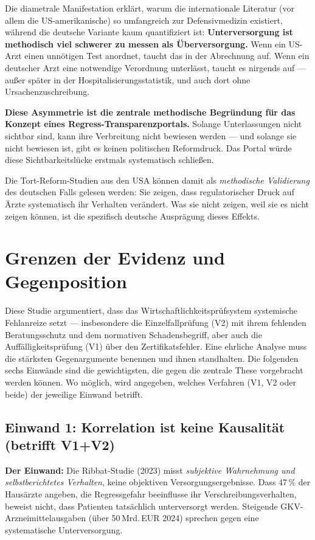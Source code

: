 \documentclass{umbruch-position}
\begin{document}
Die diametrale Manifestation erklärt, warum die internationale Literatur (vor allem die US-amerikanische) so umfangreich zur Defensivmedizin existiert, während die deutsche Variante kaum quantifiziert ist: \textbf{Unterversorgung ist methodisch viel schwerer zu messen als Überversorgung.} Wenn ein US-Arzt einen unnötigen Test anordnet, taucht das in der Abrechnung auf. Wenn ein deutscher Arzt eine notwendige Verordnung unterlässt, taucht es nirgends auf --- außer später in der Hospitalisierungsstatistik, und auch dort ohne Ursachenzuschreibung.

\textbf{Diese Asymmetrie ist die zentrale methodische Begründung für das Konzept eines Regress-Transparenzportals.} Solange Unterlassungen nicht sichtbar sind, kann ihre Verbreitung nicht bewiesen werden --- und solange sie nicht bewiesen ist, gibt es keinen politischen Reformdruck. Das Portal würde diese Sichtbarkeitslücke erstmals systematisch schließen.

Die Tort-Reform-Studien aus den USA können damit als \textit{methodische Validierung} des deutschen Falls gelesen werden: Sie zeigen, dass regulatorischer Druck auf Ärzte systematisch ihr Verhalten verändert. Was sie nicht zeigen, weil sie es nicht zeigen können, ist die spezifisch deutsche Ausprägung dieses Effekts.


\section{Grenzen der Evidenz und Gegenposition}
\label{sec:gegenposition}

Diese Studie argumentiert, dass das Wirtschaftlichkeitsprüfsystem systemische Fehlanreize setzt --- insbesondere die Einzelfallprüfung (V2) mit ihrem fehlenden Beratungsschutz und dem normativen Schadensbegriff, aber auch die Auffälligkeitsprüfung (V1) über den Zertifikatsfehler. Eine ehrliche Analyse muss die stärksten Gegenargumente benennen und ihnen standhalten. Die folgenden sechs Einwände sind die gewichtigsten, die gegen die zentrale These vorgebracht werden können. Wo möglich, wird angegeben, welches Verfahren (V1, V2 oder beide) der jeweilige Einwand betrifft.

\subsection{Einwand 1: Korrelation ist keine Kausalität (betrifft V1+V2)}

\textbf{Der Einwand:} Die Ribbat-Studie (2023) misst \textit{subjektive Wahrnehmung und selbstberichtetes Verhalten}, keine objektiven Versorgungsergebnisse. Dass 47\,\% der Hausärzte angeben, die Regressgefahr beeinflusse ihr Verschreibungsverhalten, beweist nicht, dass Patienten tatsächlich unterversorgt werden. Steigende GKV-Arzneimittelausgaben (über 50\,Mrd.\,EUR 2024) sprechen gegen eine systematische Unterversorgung.
\end{document}

